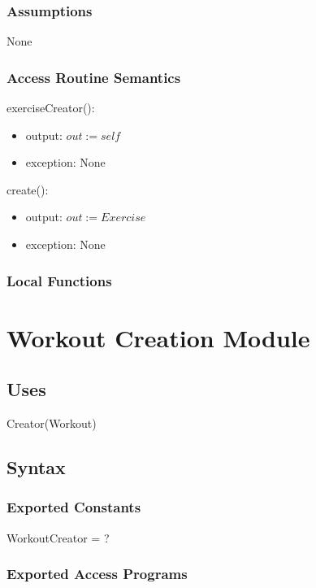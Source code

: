 \documentclass[12pt, titlepage]{article}
\begin{document}
\subsubsection{Assumptions}
None
\subsubsection{Access Routine Semantics}

\noindent exerciseCreator():
\begin{itemize}
	\item output: $out := self$
	\item exception: None
\end{itemize}

\noindent create():
\begin{itemize}
	\item output: $out := Exercise$
	\item exception: None
\end{itemize}

\subsubsection{Local Functions}

\newpage

\section{Workout Creation Module}

\subsection{Uses}

Creator(Workout)

\subsection{Syntax}

\subsubsection{Exported Constants}

WorkoutCreator = ?

\subsubsection{Exported Access Programs}
\end{document}
